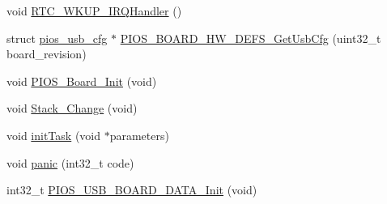\begin{DoxyCompactItemize}
void \hyperlink{group___flying_f3_ga7e78266985c97f3b7e8a9f91893657d1}{\-R\-T\-C\-\_\-\-W\-K\-U\-P\-\_\-\-I\-R\-Q\-Handler} ()
\item 
struct \hyperlink{structpios__usb__cfg}{pios\-\_\-usb\-\_\-cfg} $\ast$ \hyperlink{group___flying_f3_ga9075152ece4596f99329ba0bc3866dc9}{\-P\-I\-O\-S\-\_\-\-B\-O\-A\-R\-D\-\_\-\-H\-W\-\_\-\-D\-E\-F\-S\-\_\-\-Get\-Usb\-Cfg} (uint32\-\_\-t board\-\_\-revision)
\item 
void \hyperlink{group___flying_f3_ga902009c5b1cb57d9f9d60092eb7cacfb}{\-P\-I\-O\-S\-\_\-\-Board\-\_\-\-Init} (void)
\item 
void \hyperlink{group___flying_f3_ga7a789e7b91612099a4a1f355b9e97c24}{\-Stack\-\_\-\-Change} (void)
\item 
void \hyperlink{group___flying_f3_gae7ecc4ed0ea5858477b78acaf928c3ef}{init\-Task} (void $\ast$parameters)
\item 
void \hyperlink{group___flying_f3_ga0e4330d8eb474f118a0acaff588a8c30}{panic} (int32\-\_\-t code)
\item 
int32\-\_\-t \hyperlink{group___flying_f3_ga5efd94ab761f254827f38dba474cf642}{\-P\-I\-O\-S\-\_\-\-U\-S\-B\-\_\-\-B\-O\-A\-R\-D\-\_\-\-D\-A\-T\-A\-\_\-\-Init} (void)
\end{DoxyCompactItemize}
